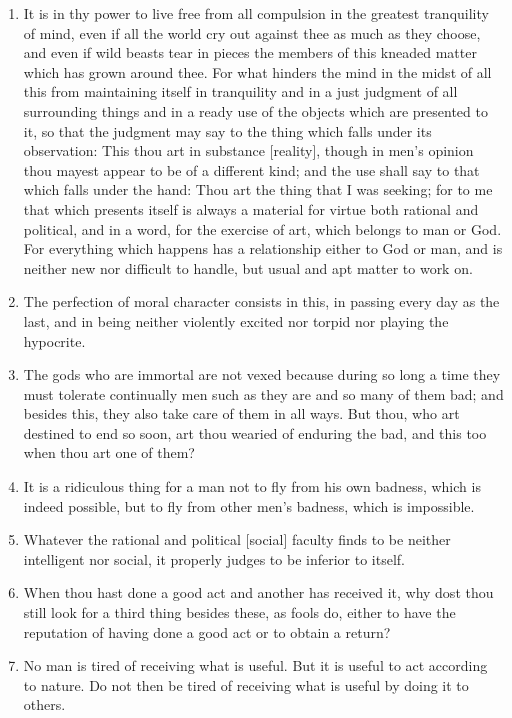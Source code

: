 \begin{enumerate}
\item It is in thy power to live free from all compulsion in the greatest tranquility of mind, even if all the world cry out against thee as much as they choose, and even if wild beasts tear in pieces the members of this kneaded matter which has grown around thee. For what hinders the mind in the midst of all this from maintaining itself in tranquility and in a just judgment of all surrounding things and in a ready use of the objects which are presented to it, so that the judgment may say to the thing which falls under its observation: This thou art in substance [{\clarify reality}], though in men's opinion thou mayest appear to be of a different kind; and the use shall say to that which falls under the hand: Thou art the thing that I was seeking; for to me that which presents itself is always a material for virtue both rational and political, and in a word, for the exercise of art, which belongs to man or God. For everything which happens has a relationship either to God or man, and is neither new nor difficult to handle, but usual and apt matter to work on.

\item The perfection of moral character consists in this, in passing every day as the last, and in being neither violently excited nor torpid nor playing the hypocrite.

\item The gods who are immortal are not vexed because during so long a time they must tolerate continually men such as they are and so many of them bad; and besides this, they also take care of them in all ways. But thou, who art destined to end so soon, art thou wearied of enduring the bad, and this too when thou art one of them?

\item It is a ridiculous thing for a man not to fly from his own badness, which is indeed possible, but to fly from other men's badness, which is impossible.

\item Whatever the rational and political [{\clarify social}] faculty finds to be neither intelligent nor social, it properly judges to be inferior to itself.

\item When thou hast done a good act and another has received it, why dost thou still look for a third thing besides these, as fools do, either to have the reputation of having done a good act or to obtain a return?

\item No man is tired of receiving what is useful. But it is useful to act according to nature. Do not then be tired of receiving what is useful by doing it to others.


\end{enumerate}
